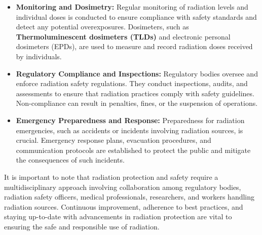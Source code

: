 \documentclass[../introduction.tex]{subfiles}
\begin{document}
\begin{itemize}
            \item \textbf{Monitoring and Dosimetry:} Regular monitoring of radiation levels and individual doses is conducted to ensure 
            compliance with safety standards and detect any potential overexposures. Dosimeters, such as \textbf{Thermoluminescent dosimeters (TLDs)} 
            and electronic personal dosimeters (EPDs), are used to measure and record radiation doses received by individuals.

            \item \textbf{Regulatory Compliance and Inspections:} Regulatory bodies oversee and enforce radiation safety regulations. 
            They conduct inspections, audits, and assessments to ensure that radiation practices comply with safety guidelines. 
            Non-compliance can result in penalties, fines, or the suspension of operations.

            \item \textbf{Emergency Preparedness and Response:} Preparedness for radiation emergencies, such as accidents or incidents involving 
            radiation sources, is crucial. Emergency response plans, evacuation procedures, and communication protocols are established to 
            protect the public and mitigate the consequences of such incidents.

        \end{itemize}
        It is important to note that radiation protection and safety require a multidisciplinary approach involving collaboration among 
        regulatory bodies, radiation safety officers, medical professionals, researchers, and workers handling radiation sources. 
        Continuous improvement, adherence to best practices, and staying up-to-date with advancements in radiation protection are vital to 
        ensuring the safe and responsible use of radiation.
\end{document}
